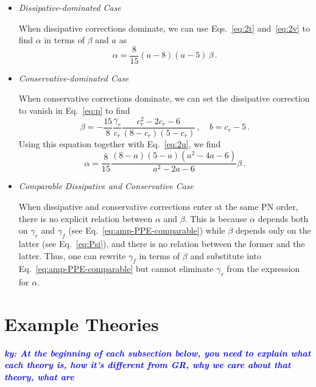 \documentclass[prd,twocolumn,nofootinbib]{revtex4-1}
\newcommand{\ky}[1]{\textcolor{blue}{\it{\textbf{ky: #1}}} }
\begin{document}
\begin{itemize}

\item
\emph{Dissipative-dominated Case}

When dissipative corrections dominate, we can use Eqs.~\eqref{eq:2t} and~\eqref{eq:2v} to find $\alpha$ in terms of $\beta$ and $a$ as
\begin{equation}
\alpha = \frac{8}{15} (a-8)(a-5) \, \beta\,.
\end{equation}


\item
\emph{Conservative-dominated Case}

When conservative corrections dominate, we can set the dissipative correction to vanish in Eq.~\eqref{eq:p} to find 
\begin{equation}\label{eq:2w}
\beta=-\frac{15}{8}\frac{\gamma_r}{c_r}\frac{c_r^2-2c_r-6}{(8-c_r)(5-c_r)}\,, \quad b=c_r-5\,.
\end{equation}
Using this equation together with Eq.~\eqref{eq:2u}, we find
\begin{equation}
\alpha =\frac{8}{15} \frac{(8-a)(5-a)(a^2-4a-6)}{a^2-2a-6} \beta\,.
\end{equation}


\item
\emph{Comparable Dissipative and Conservative Case}

When dissipative and conservative corrections enter at the same PN order, there is no explicit relation between $\alpha$ and $\beta$. This is because $\alpha$ depends both on $\gamma_r$ and $\gamma_{\dot f}$ (see Eq.~\eqref{eq:amp-PPE-comparable}) while $\beta$ depends only on the latter (see Eq.~\eqref{eq:Psi}), and there is no relation between the former and the latter. Thus, one can rewrite $\gamma_{\dot f}$ in terms of $\beta$ and substitute into Eq.~\eqref{eq:amp-PPE-comparable} but cannot eliminate $\gamma_r$ from the expression for $\alpha$. 

\end{itemize}




 \section{Example Theories}
 \vspace*{20pt}

\ky{At the beginning of each subsection below, you need to explain what each theory is, how it's different from GR, why we care about that theory, what are }
\end{document}
